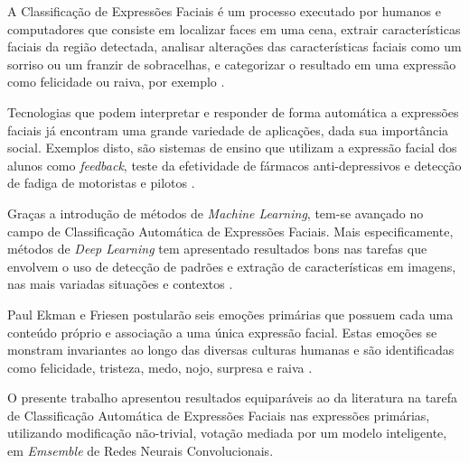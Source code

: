 A Classificação de Expressões Faciais é um processo executado por humanos e computadores que consiste em localizar faces em uma cena, extrair características faciais da região detectada, analisar alterações das características faciais como um sorriso ou um franzir de sobracelhas, e categorizar o resultado em uma expressão como felicidade ou raiva, por exemplo \cite{Pantic2009fea}.

Tecnologias que podem interpretar e responder de forma automática a expressões faciais já encontram uma grande variedade de aplicações, dada sua importância social. Exemplos disto, são sistemas de ensino que utilizam a expressão facial dos alunos como \textit{feedback}, teste da efetividade de fármacos anti-depressivos e detecção de fadiga de motoristas e pilotos \cite{Fasel2003}.

Graças a introdução de métodos de \textit{Machine Learning}, tem-se  avançado no campo de Classificação Automática de Expressões Faciais. Mais especificamente, métodos de \textit{Deep Learning} tem apresentado resultados bons nas tarefas que envolvem o uso de detecção de padrões e extração de características em imagens, nas mais variadas situações e contextos \cite{whitehill2013automatic}.

Paul Ekman e Friesen postularão seis emoções primárias que possuem cada uma conteúdo próprio e associação a uma única expressão facial. Estas emoções se monstram invariantes ao longo das diversas culturas humanas e são identificadas como felicidade, tristeza, medo, nojo, surpresa e raiva \cite{Ekman1971}.

O presente trabalho apresentou resultados equiparáveis ao da literatura na tarefa de Classificação Automática de Expressões Faciais nas expressões primárias, utilizando modificação não-trivial, votação mediada por um modelo inteligente, em \textit{Emsemble} de Redes Neurais Convolucionais.
